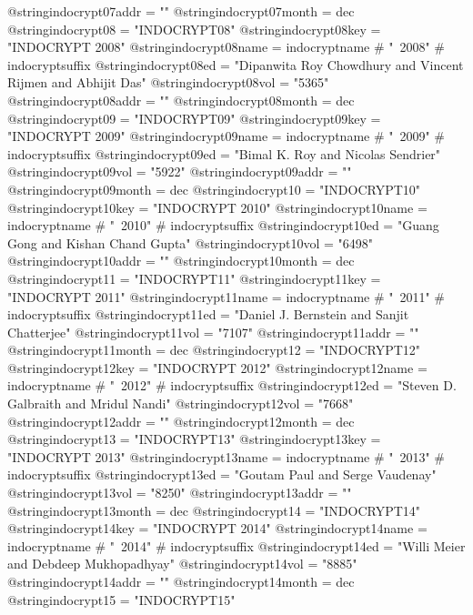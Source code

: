 @string{indocrypt07addr =       ""}
@string{indocrypt07month =      dec}
@string{indocrypt08 =           "INDOCRYPT08"}
@string{indocrypt08key =        "INDOCRYPT 2008"}
@string{indocrypt08name =       indocryptname # "~2008" # indocryptsuffix}
@string{indocrypt08ed =         "Dipanwita Roy Chowdhury and Vincent Rijmen and Abhijit Das"}
@string{indocrypt08vol =        "5365"}
@string{indocrypt08addr =       ""}
@string{indocrypt08month =      dec}
@string{indocrypt09 =           "INDOCRYPT09"}
@string{indocrypt09key =        "INDOCRYPT 2009"}
@string{indocrypt09name =       indocryptname # "~2009" # indocryptsuffix}
@string{indocrypt09ed =         "Bimal K. Roy and Nicolas Sendrier"}
@string{indocrypt09vol =        "5922"}
@string{indocrypt09addr =       ""}
@string{indocrypt09month =      dec}
@string{indocrypt10 =           "INDOCRYPT10"}
@string{indocrypt10key =        "INDOCRYPT 2010"}
@string{indocrypt10name =       indocryptname # "~2010" # indocryptsuffix}
@string{indocrypt10ed =         "Guang Gong and Kishan Chand Gupta"}
@string{indocrypt10vol =        "6498"}
@string{indocrypt10addr =       ""}
@string{indocrypt10month =      dec}
@string{indocrypt11 =           "INDOCRYPT11"}
@string{indocrypt11key =        "INDOCRYPT 2011"}
@string{indocrypt11name =       indocryptname # "~2011" # indocryptsuffix}
@string{indocrypt11ed =         "Daniel J. Bernstein and Sanjit Chatterjee"}
@string{indocrypt11vol =        "7107"}
@string{indocrypt11addr =       ""}
@string{indocrypt11month =      dec}
@string{indocrypt12 =           "INDOCRYPT12"}
@string{indocrypt12key =        "INDOCRYPT 2012"}
@string{indocrypt12name =       indocryptname # "~2012" # indocryptsuffix}
@string{indocrypt12ed =         "Steven D. Galbraith and Mridul Nandi"}
@string{indocrypt12vol =        "7668"}
@string{indocrypt12addr =       ""}
@string{indocrypt12month =      dec}
@string{indocrypt13 =           "INDOCRYPT13"}
@string{indocrypt13key =        "INDOCRYPT 2013"}
@string{indocrypt13name =       indocryptname # "~2013" # indocryptsuffix}
@string{indocrypt13ed =         "Goutam Paul and Serge Vaudenay"}
@string{indocrypt13vol =        "8250"}
@string{indocrypt13addr =       ""}
@string{indocrypt13month =      dec}
@string{indocrypt14 =           "INDOCRYPT14"}
@string{indocrypt14key =        "INDOCRYPT 2014"}
@string{indocrypt14name =       indocryptname # "~2014" # indocryptsuffix}
@string{indocrypt14ed =         "Willi Meier and Debdeep Mukhopadhyay"}
@string{indocrypt14vol =        "8885"}
@string{indocrypt14addr =       ""}
@string{indocrypt14month =      dec}
@string{indocrypt15 =           "INDOCRYPT15"}
